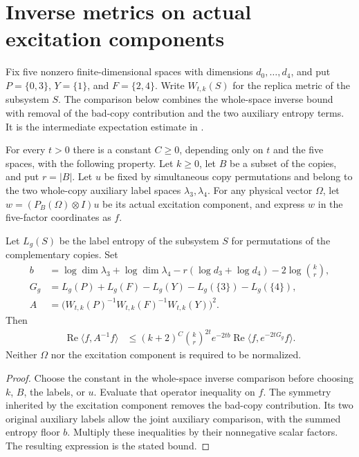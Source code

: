 \section{Inverse metrics on actual excitation components}

Fix five nonzero finite-dimensional spaces with dimensions $d_0,\ldots,d_4$,
and put $P=\{0,3\}$, $Y=\{1\}$, and $F=\{2,4\}$. Write $W_{t,k}(S)$ for
the replica metric of the subsystem $S$. The comparison below combines
the whole-space inverse bound with removal of the bad-copy contribution
and the two auxiliary entropy terms. It is the intermediate expectation
estimate in \cite[Section~8]{OpenAI2026AreaLaw}.

\begin{theorem}
  \label{thm:actual_component_inverse_good_expectation}
  \leanok
  For every $t>0$ there is a constant $C\geq0$, depending only on $t$ and
  the five spaces, with the following property. Let $k\geq0$, let $B$ be
  a subset of the copies, and put $r=|B|$. Let $u$ be fixed by simultaneous
  copy permutations and belong to the two whole-copy auxiliary label
  spaces $\lambda_3,\lambda_4$. For any physical vector $\Omega$, let
  $w=(P_B(\Omega)\otimes I)u$ be its actual excitation component, and
  express $w$ in the five-factor coordinates as $f$.

  Let $L_g(S)$ be the label entropy of the subsystem $S$ for permutations
  of the complementary copies. Set
  \begin{align}
    b&=\log\dim\lambda_3+\log\dim\lambda_4
       -r(\log d_3+\log d_4)-2\log\binom{k}{r},\\
    G_g&=L_g(P)+L_g(F)-L_g(Y)-L_g(\{3\})-L_g(\{4\}),\\
    A&=\bigl(W_{t,k}(P)^{-1}W_{t,k}(F)^{-1}W_{t,k}(Y)\bigr)^2.
  \end{align}
  Then
  \begin{align}
    \operatorname{Re}\langle f,A^{-1}f\rangle
    &\leq (k+2)^C\binom{k}{r}^{2t}e^{-2tb}
      \operatorname{Re}\langle f,e^{-2tG_g}f\rangle.
  \end{align}
  Neither $\Omega$ nor the excitation component is required to be normalized.
\end{theorem}
\begin{proof}
  \leanok
  Choose the constant in the whole-space inverse comparison before choosing
  $k$, $B$, the labels, or $u$. Evaluate that operator inequality on $f$.
  The symmetry inherited by the excitation component removes the bad-copy
  contribution. Its two original auxiliary labels allow the joint auxiliary
  comparison, with the summed entropy floor $b$. Multiply these inequalities
  by their nonnegative scalar factors. The resulting expression is the
  stated bound.
\end{proof}
